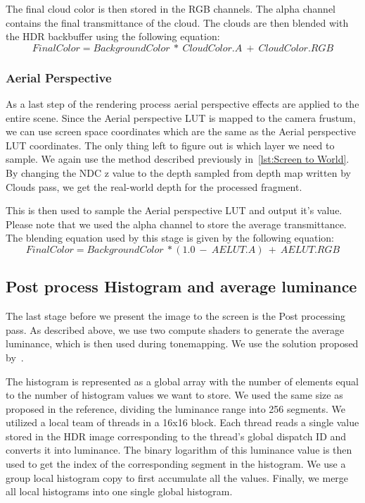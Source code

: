 \documentclass{ctuthesis}
\begin{document}
The final cloud color is then stored in the RGB channels. The alpha channel contains the final 
transmittance of the cloud. The clouds are then blended with the HDR backbuffer using the following 
equation:
\begin{equation}
    Final Color = BackgroundColor\ *\ CloudColor.A\ +\ CloudColor.RGB
\end{equation}

\subsubsection{Aerial Perspective}
As a last step of the rendering process aerial perspective effects are applied to the entire
scene. Since the Aerial perspective LUT is mapped to the camera frustum, we can use screen 
space coordinates which are the same as the Aerial perspective LUT coordinates. The only thing left
to figure out is which layer we need to sample. We again use the method described previously
in~\ref{lst:Screen to World}. By changing the NDC z value to the depth sampled from depth map 
written by Clouds pass, we get the real-world depth for the processed fragment.

This is then used to sample the Aerial perspective LUT and output it's value. Please note
that we used the alpha channel to store the average transmittance. The blending equation
used by this stage is given by the following equation:
\begin{equation}
    Final Color = BackgroundColor\ * (1.0\ -\ AELUT.A)\ +\ AELUT.RGB 
\end{equation}

\subsection{Post process Histogram and average luminance}
The last stage before we present the image to the screen is the Post processing pass. 
As described above, we use two compute shaders to generate the average luminance, which 
is then used during tonemapping. We use the solution proposed by~\cite{tardif_2019}.

The histogram is represented as a global array with the number of elements equal
to the number of histogram values we want to store. We used the same size as proposed in the reference,
dividing the luminance range into 256 segments. We utilized a local team of threads in a 16x16 block.
Each thread reads a single value stored in the HDR image corresponding to the thread's global dispatch
ID and converts it into luminance. The binary logarithm of this luminance value is then used to 
get the index of the corresponding segment in the histogram. We use a group local histogram copy
to first accumulate all the values. Finally, we merge all local histograms into one single global
histogram.
\end{document}
